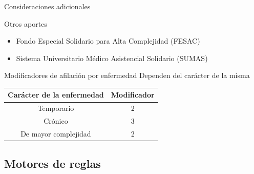 \documentclass[10pt]{beamer}
\begin{document}
\begin{frame}{Consideraciones adicionales}
    \begin{block}{Otros aportes}
        \begin{itemize}
            \item Fondo Especial Solidario para Alta Complejidad (FESAC)
            \item Sistema Universitario Médico Asistencial Solidario (SUMAS)
        \end{itemize}
    \end{block}
    \begin{block}{Modificadores de afilación por enfermedad}
        Dependen del carácter de la misma
        \begin{table}
            \centering
        \begin{tabular}{|c|c|}
            \hline
            Carácter de la enfermedad & Modificador \\ \hline
            Temporario & 2 \\ \hline
            Crónico & 3 \\ \hline
            De mayor complejidad & 2 \\ \hline
        \end{tabular}
        \end{table}
    \end{block}
\end{frame}

\subsection{Motores de reglas}
\end{document}
